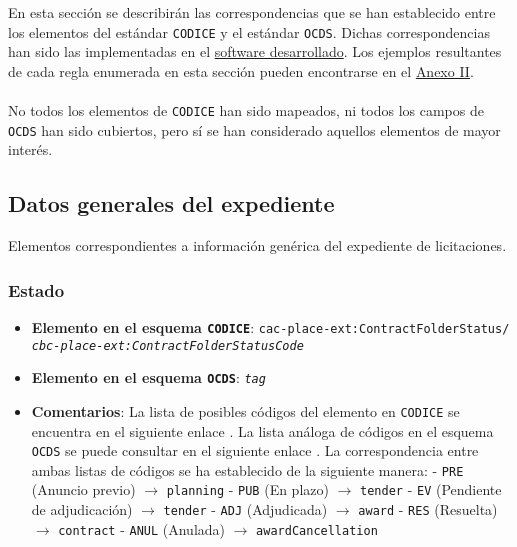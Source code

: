 
    En esta sección se describirán las correspondencias que se han establecido entre los elementos del estándar \texttt{CODICE} y el estándar \texttt{OCDS}. Dichas correspondencias han sido las implementadas en el \hyperref[sec:software]{software desarrollado}. Los ejemplos resultantes de cada regla enumerada en esta sección pueden encontrarse en el \hyperref[annex:correspondencias]{Anexo II}.
    \\ \\
    No todos los elementos de \texttt{CODICE} han sido mapeados, ni todos los campos de \texttt{OCDS} han sido cubiertos, pero sí se han considerado aquellos elementos de mayor interés.

    \vspace{0.3cm}
    
    \subsection{Datos generales del expediente}
    
    Elementos correspondientes a información genérica del expediente de licitaciones.
    
        \subsubsection{Estado}
            \begin{itemize}
                \item \textbf{Elemento en el esquema \texttt{CODICE}}:
                    \tabto{7.6cm} \texttt{cac-place-ext:ContractFolderStatus/} \\
                    \tabto{7.6cm} \texttt{\textit{cbc-place-ext:ContractFolderStatusCode}}
                \item \textbf{Elemento en el esquema \texttt{OCDS}}:
                    \tabto{7.6cm} \texttt{\textit{tag}}
                \item \textbf{Comentarios}: La lista de posibles códigos del elemento en \texttt{CODICE} se encuentra en el siguiente enlace \cite{CR1}.
                    La lista análoga de códigos en el esquema \texttt{OCDS} se puede consultar en el siguiente enlace \cite{CR2}.
                    La correspondencia entre ambas listas de códigos se ha establecido de la siguiente manera:
                        \subitem - \texttt{PRE} (Anuncio previo) $\rightarrow$ \texttt{planning}
                        \subitem - \texttt{PUB} (En plazo) $\rightarrow$ \texttt{tender}
                        \subitem - \texttt{EV} (Pendiente de adjudicación) $\rightarrow$ \texttt{tender}
                        \subitem - \texttt{ADJ} (Adjudicada) $\rightarrow$ \texttt{award}
                        \subitem - \texttt{RES} (Resuelta) $\rightarrow$ \texttt{contract}
                        \subitem - \texttt{ANUL} (Anulada) $\rightarrow$ \texttt{awardCancellation}
            \end{itemize}
        
